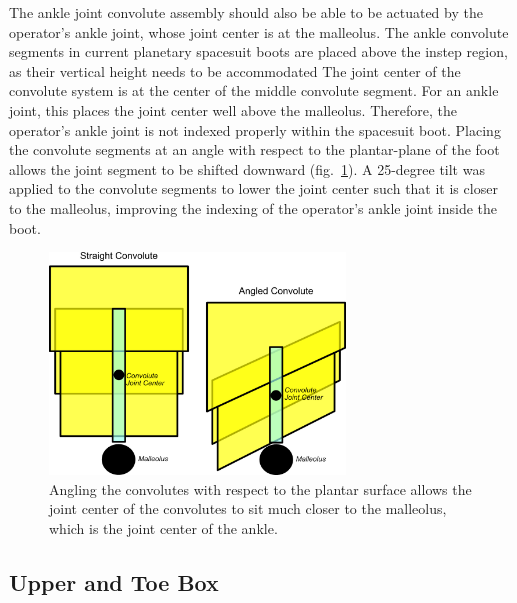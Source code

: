 \documentclass[defaultstyle,11pt]{thesis}
\begin{document}
The ankle joint convolute assembly should also be able to be actuated by the operator's ankle joint, whose joint center is at the malleolus.
The ankle convolute segments in current planetary spacesuit boots are placed above the instep region, as their vertical height needs to be accommodated
The joint center of the convolute system is at the center of the middle convolute segment.
For an ankle joint, this places the joint center well above the malleolus.
Therefore, the operator's ankle joint is not indexed properly within the spacesuit boot.
Placing the convolute segments at an angle with respect to the plantar-plane of the foot allows the joint segment to be shifted downward (fig.~\ref{fig:SA3-convolute_ang}).
A 25-degree tilt was applied to the convolute segments to lower the joint center such that it is closer to the malleolus, improving the indexing of the operator's ankle joint inside the boot.

\begin{figure}
\hypertarget{fig:SA3-convolute_ang}{%
\centering
\includegraphics[width=0.7\textwidth,height=\textheight]{../fig/SA3/Convolute_Angled.png}
\caption{Angling the convolutes with respect to the plantar surface allows the joint center of the convolutes to sit much closer to the malleolus, which is the joint center of the ankle.}\label{fig:SA3-convolute_ang}
}
\end{figure}

\hypertarget{upper-and-toe-box}{%
\subsection{Upper and Toe Box}\label{upper-and-toe-box}}
\end{document}
